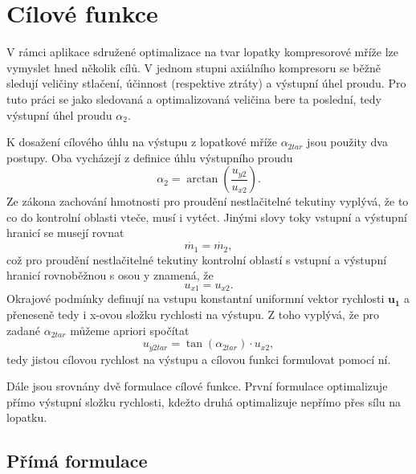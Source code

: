 \section{Cílové funkce}

V rámci aplikace sdružené optimalizace na tvar lopatky kompresorové mříže lze vymyslet hned několik cílů. V jednom stupni axiálního kompresoru se běžně sledují veličiny stlačení, účinnost (respektive ztráty) a výstupní úhel proudu. Pro tuto práci se jako sledovaná a optimalizovaná veličina bere ta poslední, tedy výstupní úhel proudu $ \alpha_2 $. 

K dosažení cílového úhlu na výstupu z lopatkové mříže $ \alpha_{2tar} $ jsou použity dva postupy. Oba vycházejí z definice úhlu výstupního proudu
\begin{equation}
\alpha_2 = \arctan\left(\dfrac{u_{y2}}{u_{x2}}\right).
\end{equation}
Ze zákona zachování hmotnosti pro proudění nestlačitelné tekutiny vyplývá, že to co do kontrolní oblasti vteče, musí i vytéct. Jinými slovy toky vstupní a výstupní hranicí se musejí rovnat
\begin{equation}
\dot{m_1}=\dot{m_2},
\end{equation}
což pro proudění nestlačitelné tekutiny kontrolní oblastí s vstupní a výstupní hranicí rovnoběžnou s osou y znamená, že 
\begin{equation}
u_{x1}=u_{x2}.
\end{equation}
Okrajové podmínky definují na vstupu konstantní uniformní vektor rychlosti $ \mathbf{u_1} $ a přeneseně tedy i x-ovou složku rychlosti na výstupu. Z toho vyplývá, že pro zadané $ \alpha_{2tar} $ můžeme apriori spočítat
\begin{equation}
u_{y2tar} = \tan(\alpha_{2tar}) \cdot u_{x2},
\end{equation}
tedy jistou cílovou rychlost na výstupu a cílovou funkci formulovat pomocí ní.

Dále jsou srovnány dvě formulace cílové funkce. První formulace optimalizuje přímo výstupní složku rychlosti, kdežto druhá optimalizuje nepřímo přes sílu na lopatku.

\subsection{Přímá formulace}

